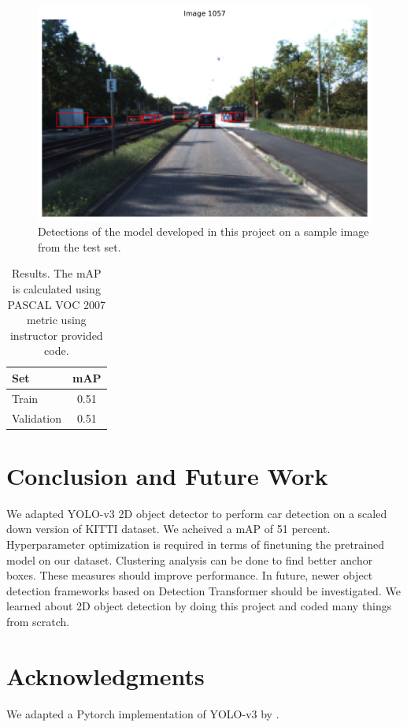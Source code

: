 \documentclass[10pt,twocolumn,letterpaper]{article}
\begin{document}
\begin{figure}[t]
	\begin{center}
		\includegraphics[width=1.0\linewidth]{figure1057.png}
	\end{center}
	\caption{Detections of the model developed in this project on a sample image from the test set.}
	\label{fig:pred_example_plot2}
\end{figure}


\begin{table}
	\begin{center}
		\begin{tabular}{|l|c|}
			\hline
			Set & mAP \\
			\hline\hline
			Train & 0.51 \\
			Validation & 0.51\\
			\hline
		\end{tabular}
	\end{center}
	\caption{Results. The mAP is calculated using PASCAL VOC 2007 metric using instructor provided code.}
	\label{tab:results}
\end{table}

\section{Conclusion and Future Work}
We adapted YOLO-v3 2D object detector to perform car detection on a scaled down version of KITTI dataset. We acheived a mAP of 51 percent. Hyperparameter optimization is required in terms of finetuning the pretrained model on our dataset. Clustering analysis can be done to find better anchor boxes. These measures should improve performance. In future, newer object detection frameworks based on Detection Transformer should be investigated. We learned about 2D object detection by doing this project and coded many things from scratch.
\section{Acknowledgments}
We adapted a Pytorch implementation of YOLO-v3 by \cite{yolov3pytorch2022}.


{\small


}
\end{document}
